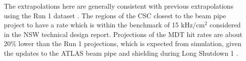 The extrapolations here are generally consistent with previous extrapolations using the Run 1 dataset \cite{CERN-LHCC-2013-006,ATL-COM-MUON-2013-003,ATL-COM-MUON-2013-011}. The regions of the CSC closest to the beam pipe project to have a rate which is within the benchmark of 15 $\text{kHz} / \text{cm}^2$ considered in the NSW technical design report. Projections of the MDT hit rates are about 20\% lower than the Run 1 projections, which is expected from simulation, given the updates to the ATLAS beam pipe and shielding during Long Shutdown 1 \cite{ATL-COM-MUON-2014-027}.
